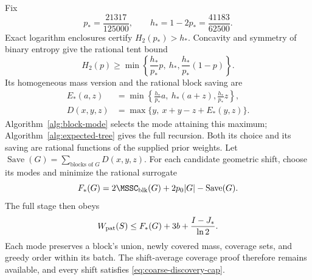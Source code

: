 Fix
\[
 p_* =\frac{21317}{125000},\qquad
 h_* =1-2p_* =\frac{41183}{62500}.
\]
Exact logarithm enclosures certify $H_2(p_*)>h_*$. Concavity and
symmetry of binary entropy give the rational tent bound
\[
 H_2(p)\ge\min\left\{\frac{h_*}{p_*}p,\ h_*,
                         \frac{h_*}{p_*}(1-p)\right\}.
\]
Its homogeneous mass version and the rational block saving are
\begin{equation}\label{eq:rational-block-saving}
 \begin{aligned}
 E_*(a,z)&=\min\left\{\frac{h_*}{p_*}a,\ h_*(a+z),
                                  \frac{h_*}{p_*}z\right\},\\
 D(x,y,z)&=\max\{y,\ x+y-z+E_*(y,z)\}.
 \end{aligned}
\end{equation}
Algorithm~\ref{alg:block-mode} selects the mode attaining this maximum;
Algorithm~\ref{alg:expected-tree} gives the full recursion. Both its choice and its saving
are rational functions of the supplied prior weights. Let
$\operatorname{Save}(G)=\sum_{\text{blocks of }G}D(x,y,z)$.
For each candidate geometric shift, choose its modes and minimize
the rational surrogate
\begin{equation}\label{eq:adaptive-shift-objective}
 F_*(G)=2\MSSC_{\rm blk}(G)+2p_0|G|-\operatorname{Save}(G).
\end{equation}
The full stage then obeys
\begin{equation}\label{eq:adaptive-stage}
 W_{\rm pat}(S)\le F_*(G)+3b+\frac{I-J_*}{\ln2}.
\end{equation}
Each mode preserves a block's union, newly covered mass, coverage sets,
and greedy order within its batch. The shift-average coverage proof
therefore remains available, and every shift satisfies
\eqref{eq:coarse-discovery-cap}.



